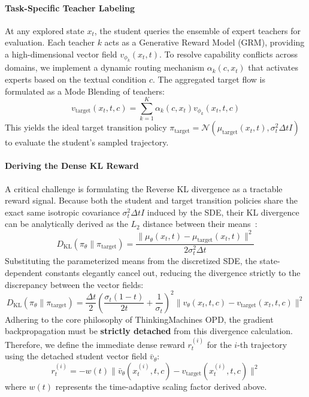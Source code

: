 \paragraph{Task-Specific Teacher Labeling}
At any explored state $x_t$, the student queries the ensemble of expert teachers for evaluation. Each teacher $k$ acts as a Generative Reward Model (GRM), providing a high-dimensional vector field $v_{\phi_k}(x_t, t)$. To resolve capability conflicts across domains, we implement a dynamic routing mechanism $\alpha_k(c, x_t)$ that activates experts based on the textual condition $c$. The aggregated target flow is formulated as a Mode Blending of teachers:
\begin{equation}
v_{\text{target}}(x_t, t, c) = \sum_{k=1}^K \alpha_k(c, x_t) v_{\phi_k}(x_t, t, c)
\end{equation}
This yields the ideal target transition policy $\pi_{\text{target}} = \mathcal{N}(\mu_{\text{target}}(x_t, t), \sigma_t^2 \Delta t I)$ to evaluate the student's sampled trajectory.

\paragraph{Deriving the Dense KL Reward}
A critical challenge is formulating the Reverse KL divergence as a tractable reward signal. Because both the student and target transition policies share the exact same isotropic covariance $\sigma_t^2 \Delta t I$ induced by the SDE, their KL divergence can be analytically derived as the $L_2$ distance between their means~\cite{liu2025flow}:
\begin{equation}
D_{\text{KL}}(\pi_\theta \| \pi_{\text{target}}) = \frac{\| \mu_\theta(x_t, t) - \mu_{\text{target}}(x_t, t) \|^2}{2\sigma_t^2 \Delta t}
\end{equation}
Substituting the parameterized means from the discretized SDE, the state-dependent constants elegantly cancel out, reducing the divergence strictly to the discrepancy between the vector fields:
\begin{equation}
D_{\text{KL}}(\pi_\theta \| \pi_{\text{target}}) = \frac{\Delta t}{2} \left( \frac{\sigma_t(1-t)}{2t} + \frac{1}{\sigma_t} \right)^2 \| v_\theta(x_t, t, c) - v_{\text{target}}(x_t, t, c) \|^2
\end{equation}
Adhering to the core philosophy of ThinkingMachines OPD, the gradient backpropagation must be \textbf{strictly detached} from this divergence calculation. Therefore, we define the immediate dense reward $r_t^{(i)}$ for the $i$-th trajectory using the detached student vector field $\bar{v}_\theta$:
\begin{equation}
r_t^{(i)} = - w(t) \| \bar{v}_\theta(x_t^{(i)}, t, c) - v_{\text{target}}(x_t^{(i)}, t, c) \|^2
\end{equation}
where $w(t)$ represents the time-adaptive scaling factor derived above.

